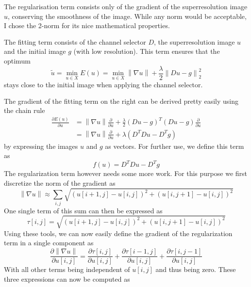 \documentclass{paper}
\newcommand{\norm}[1]{\left\lVert#1\right\rVert}
\begin{document}
The regularisation term consists only of the gradient
of the superresolution image $u$, conserving the smoothness of the image.
While any norm would be acceptable, I chose the 2-norm for its nice
mathematical properties.

The fitting term consists of the channel selector $D$, 
the superresolution image $u$ and the initial image $g$ (with low resolution).
This term ensures that the optimum
\begin{equation}
\tilde{u} = \min_{u \in X} E(u) = \min_{u \in X} \norm{\nabla u} + \frac{\lambda}{2} \norm{Du - g}^2_2
\end{equation}
stays close to the initial
image when applying the channel selector. 

The gradient of the fitting term on the right can be derived pretty easily using the chain rule
\begin{align}
\frac{\partial E(u)}{\partial u} 
&= \norm{\nabla u}\frac{\partial}{\partial u} + 
\frac{\lambda}{2} (Du - g)^T(Du - g) \frac{\partial}{\partial u} \\
&= \norm{\nabla u} \frac{\partial}{\partial u} + \lambda (D^T D u - D^T g)
\end{align}
by expressing the images $u$ and $g$ as vectors. For further use, we define
this term as 
\begin{equation}
 f(u) = D^T D u - D^T g
\end{equation}
The regularization term however needs some more work. 
For this purpose we first discretize the norm of the gradient as
\begin{equation}
\norm{\nabla u} \approx \sum_{i,j} 
	\sqrt{(u[i+1,j] - u[i,j])^2 + (u[i, j+1] - u[i, j])^2}
\end{equation}
One single term of this sum can then be expressed as
\begin{equation}
\tau[i,j] = \sqrt{(u[i+1,j] - u[i,j])^2 + (u[i, j+1] - u[i, j])^2}
\end{equation}
Using these tools, we can now easily define the gradient of the regularization term in a single component as
\begin{equation}
\frac{\partial \norm{\nabla u}}{\partial u[i,j]} = 
	\frac{\partial \tau[i,j]}{\partial u[i,j]} +
	\frac{\partial \tau[i - 1,j]}{\partial u[i,j]} +
	\frac{\partial \tau[i,j - 1]}{\partial u[i,j]}
\end{equation}
With all other terms being independent of $u[i,j]$ and thus being zero.
These three expressions can now be computed as
\end{document}
